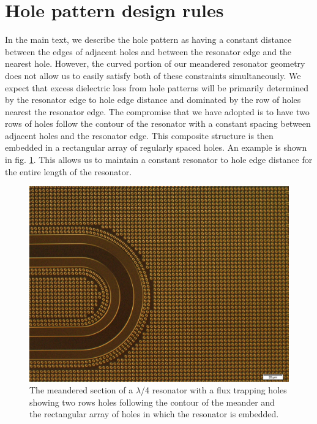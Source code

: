 \section{Hole pattern design rules}
In the main text, we describe the hole pattern as having a constant distance between the edges of adjacent holes and between the resonator edge and the nearest hole.  However, the curved portion of our meandered resonator geometry does not allow us to easily satisfy both of these constraints simultaneously.  We expect that excess dielectric loss from hole patterns will be primarily determined by the resonator edge to hole edge distance and dominated by the row of holes nearest the resonator edge.  The compromise that we have adopted is to have two rows of holes follow the contour of the resonator with a constant spacing between adjacent holes and the resonator edge.  This composite structure is then embedded in a rectangular array of regularly spaced holes.  An example is shown in fig. \ref{meander_holearray}.  This allows us to maintain a constant resonator to hole edge distance for the entire length of the resonator.
\begin{figure}
    \begin{center}
        \includegraphics[width=150mm]{DielectricFluxTrap_Supp_Rev2_meander}
        \caption{The meandered section of a $\lambda$/4 resonator with a flux trapping holes showing two rows holes following the contour of the meander and the rectangular array of holes in which the resonator is embedded.}
        \label{meander_holearray}
    \end{center}
\end{figure}

